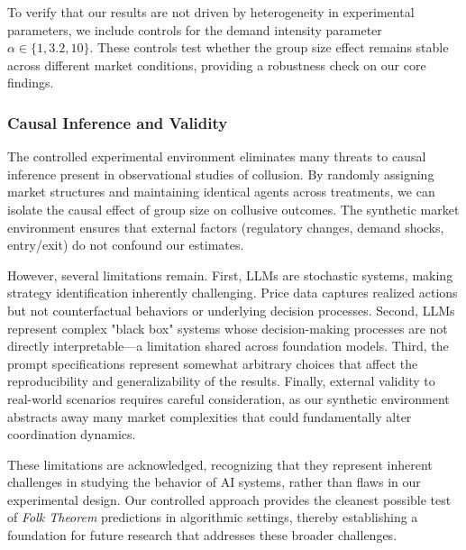To verify that our results are not driven by heterogeneity in experimental parameters, we include controls for the demand intensity parameter $\alpha \in \{1, 3.2, 10\}$. These controls test whether the group size effect remains stable across different market conditions, providing a robustness check on our core findings.

\subsubsection*{Causal Inference and Validity}

The controlled experimental environment eliminates many threats to causal inference present in observational studies of collusion. By randomly assigning market structures and maintaining identical agents across treatments, we can isolate the causal effect of group size on collusive outcomes. The synthetic market environment ensures that external factors (regulatory changes, demand shocks, entry/exit) do not confound our estimates.

However, several limitations remain. First, LLMs are stochastic systems, making strategy identification inherently challenging. Price data captures realized actions but not counterfactual behaviors or underlying decision processes. Second, LLMs represent complex "black box" systems whose decision-making processes are not directly interpretable—a limitation shared across foundation models. Third, the prompt specifications represent somewhat arbitrary choices that affect the reproducibility and generalizability of the results. Finally, external validity to real-world scenarios requires careful consideration, as our synthetic environment abstracts away many market complexities that could fundamentally alter coordination dynamics.

These limitations are acknowledged, recognizing that they represent inherent challenges in studying the behavior of AI systems, rather than flaws in our experimental design. Our controlled approach provides the cleanest possible test of \emph{Folk Theorem} predictions in algorithmic settings, thereby establishing a foundation for future research that addresses these broader challenges.


